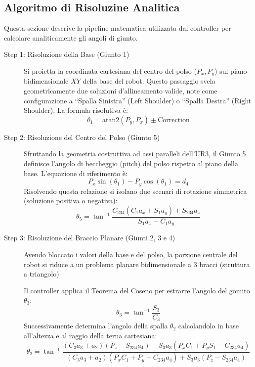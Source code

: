 \subsection{Algoritmo di Risoluzine Analitica}
Questa sezione descrive la pipeline matematica utilizzata dal controller per calcolare analiticamente gli angoli di giunto.
\begin{description}
    \item [Step 1: Risoluzione della Base (Giunto 1)] Si proietta la coordinata cartesiana del centro del polso ($P_x, P_y$) sul piano bidimensionale $ XY $ della base del robot. Questo passaggio svela geometricamente due soluzioni d'allineamento valide, note come configurazione a ``Spalla Sinistra'' (Left Shoulder) o ``Spalla Destra'' (Right Shoulder). La formula risolutiva è:
          \[
              \theta_1 = \text{atan2}(P_y, P_x) \pm \text{Correction}
          \]
    \item [Step 2: Risoluzione del Centro del Polso (Giunto 5)] Sfruttando la geometria costruttiva ad assi paralleli dell'UR3, il Giunto 5 definisce l'angolo di beccheggio (pitch) del polso rispetto al piano della base. L'equazione di riferimento è:
          \[
              P_x \sin(\theta_1) - P_y \cos(\theta_1) = d_4
          \]
          Risolvendo questa relazione si isolano due scenari di rotazione simmetrica (soluzione positiva o negativa):
          \[
              \theta_{5}=\tan^{-1}\frac{C_{234}(C_{1}a_{x}+S_{1}a_{y})+S_{234}a_{z}}{S_{1}a_{x}-C_{1}a_{y}}
          \]
    \item [Step 3: Risoluzione del Braccio Planare (Giunti 2, 3 e 4)] Avendo bloccato i valori della base e del polso, la porzione centrale del robot si riduce a un problema planare bidimensionale a 3 bracci (struttura a triangolo).

          Il controller applica il Teorema del Coseno per estrarre l'angolo del gomito $\theta_3$:
          \[
              \theta_{3}=\tan^{-1}\frac{S_{3}}{C_{3}}
          \]
          Successivamente determina l'angolo della spalla $\theta_2$ calcolandolo in base all'altezza e al raggio della terna cartesiana:
          \[
              \theta_2 = \tan^{-1}\frac{(C_3a_3+a_2)(P_z-S_{234}a_{4})-S_3a_3(P_xC_1+P_yS_1-C_{234}a_{4})}{(C_3a_3+a_2)(P_xC_1+P_y-C_{234}a_{4})+S_3a_3(P_z-S_{234}a_{4})}
          \]
\end{description}

%

